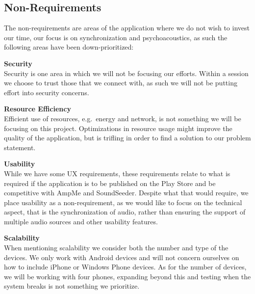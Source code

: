 \subsection*{Non-Requirements}\label{par:non_requirements}
The non-requirements are areas of the application where we do not wish to invest our time, our focus is on synchronization and psychoacoustics, as such the following areas have been down-prioritized:
\begin{eromanrate}
    \item \textbf{Security} \hfill\\
    Security is one area in which we will not be focusing our efforts.
    Within a session we choose to trust those that we connect with,
    as such we will not be putting effort into security concerns.
    \item \textbf{Resource Efficiency} \hfill\\
    Efficient use of resources, e.g.~energy and network, is not something we will be focusing on this project.
    Optimizations in resource usage might improve the quality of the application, but is trifling in order to find a solution to our problem statement.
    \item \textbf{Usability} \hfill\\
    While we have some \ac{UX} requirements, these requirements relate to what is required if the application is to be published on the Play Store and be competitive with AmpMe and SoundSeeder.
    Despite what that would require, we place usability as a non-requirement, as we would like to focus on the technical aspect, that is the synchronization of audio, rather than ensuring the support of multiple audio sources and other usability features.
    \item \textbf{Scalability} \hfill\\
    When mentioning scalability we consider both the number and type of the devices.
    We only work with Android devices and will not concern ourselves on how to include iPhone or Windows Phone devices.
    As for the number of devices, we will be working with four phones, expanding beyond this and testing when the system breaks is not something we prioritize.
\end{eromanrate}
